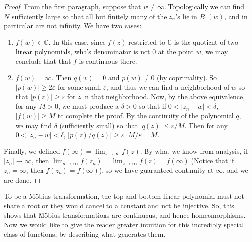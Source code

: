 \documentclass[12pt]{article}
\theoremstyle{definitionstyle}
\def\mbb#1{\mathbb{#1}}
\def \C{\mbb{C}}
\def \ve{\varepsilon}
\begin{document}
\begin{proof}
		From the first paragraph, suppose that $w \neq \infty$. Topologically we can find $N$ sufficiently large so that all but finitely many of the $z_n$'s lie in $B_1(w)$, and in particular are not infinity. We have two cases:
		\begin{enumerate}[label=(\arabic*)]
			\item $f(w) \in \C$. In this case, since $f(z)$ restricted to $\C$ is the quotient of two linear polynomials, who's denominator is not 0 at the point $w$, we may conclude that that $f$ is continuous there.
			\item $f(w) = \infty$. Then $q(w) = 0$ and $p(w) \neq 0$ (by coprimality). So $|p(w)| \geq 2\ve$ for some small $\ve$, and thus we can find a neighborhood of $w$ so that $|p(z)| \geq \ve$ for $z$ in that neighborhood. Now, by the above equivalence, for any $M > 0$, we must produce a $\delta > 0$ so that if $0 < |z_n - w| < \delta$, $|f(w)| \geq M$ to complete the proof. By the continuity of the polynomial $q$, we may find $\delta$ (sufficiently small) so that $|q(z)| \leq \ve/M$. Then for any $0 < |z_n-w| < \delta$, $|p(z)/q(z)| \geq \ve \cdot M/\ve = M$.
		\end{enumerate}
		Finally, we defined $f(\infty) = \lim_{z \to \infty} f(z)$. By what we know from analysis, if $|z_n| \to \infty$, then $\lim_{n \to \infty} f(z_n) = \lim_{z \to \infty} f(z) = f(\infty)$ (Notice that if $z_n = \infty$, then $f(z_n) = f(\infty)$), so we have guaranteed continuity at $\infty$, and we are done.
	\end{proof}
	
	To be a Möbius transformation, the top and bottom linear polynomial must not share a root or they would cancel to a constant and not be injective. So, this shows that Möbius transformations are continuous, and hence homeomorphisms. Now we would like to give the reader greater intuition for this incredibly special class of functions, by describing what generates them.
	
\end{document}
